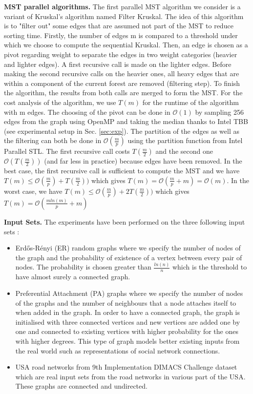 \documentclass[letterpaper]{article}
\newcommand{\mypar}[1]{{\bf #1.}}
\begin{document}
\mypar{MST parallel algorithms}  The first parallel MST algorithm we consider is a variant of Kruskal's algorithm named Filter Kruskal. The idea of this algorithm is to "filter out" some edges that are assumed not part of the MST to reduce sorting time. Firstly, the number of edges m is compared to a threshold under which we choose to compute the sequential Kruskal. Then, an edge is chosen as a pivot regarding weight to separate the edges in two weight categories (heavier and lighter edges). A first recursive call is made on the lighter edges. Before making the second recursive calls on the heavier ones, all heavy edges that are within a component of the current forest are removed (filtering step). To finish the algorithm, the results from both calls are merged to form the MST. For the cost analysis of the algorithm, we use $T(m)$ for the runtime of the algorithm with m edges. The choosing of the pivot can be done in $\mathcal{O}(1)$ by sampling 256 edges from the graph using OpenMP and taking the median thanks to Intel TBB (see experimental setup in Sec. \ref{sec:exp}). The partition of the edges as well as the filtering can both be done in $\mathcal{O}(\frac{m}{p})$ using the partition function from Intel Parallel STL. The first recursive call costs $T(\frac{m}{2})$ and the second one $\mathcal{O}(T(\frac{m}{2}))$ (and far less in practice) because edges have been removed. In the best case, the first recursive call is sufficient to compute the MST and we have $T(m) \leq  \mathcal{O}(\frac{m}{p}) + T(\frac{m}{2})) $ which gives $T(m) = \mathcal{O}(\frac{m}{p} + m) = \mathcal{O}(m)$. In the worst case, we have $T(m) \leq  \mathcal{O}(\frac{m}{p}) + 2T(\frac{m}{2})) $ which gives $T(m) = \mathcal{O}(\frac{mln(m)}{p} + m)$

\mypar{Input Sets}
The experiments have been performed on the three following input sets :

\begin{itemize}
    \item Erd\H{o}s-R\'{e}nyi (ER) random graphs where we specify the number of nodes of the graph and the probability of existence of a vertex between every pair of nodes. The probability is chosen greater than $\frac{ln(n)}{n}$ which is the threshold to have almost surely a connected graph.
    \item Preferential Attachment (PA) graphs where we specify the number of nodes of the graphs and the number of neighbours that a node attaches itself to when added in the graph. In order to have a connected graph, the graph is initialised with three connected vertices and new vertices are added one by one and connected to existing vertices with higher probability for the ones with higher degrees. This type of graph models better existing inputs from the real world such as representations of social network connections.  
    \item USA road networks from 9th Implementation DIMACS Challenge dataset which are real input sets from the road networks in various part of the USA. These graphs are connected and undirected.
\end{itemize}
\end{document}
